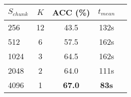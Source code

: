 \begin{table}[ht!]
    \centering
    \begin{tabular}{lc|ccc}
      \toprule
      $S_{chunk}$ & $K$ & ACC (\%) & $t_{mean}$ \\
      \midrule
      256  & 12 & 43.5 & 132s \\
      512  & 6  & 57.5 & 162s \\
      1024 & 3  & 64.5 & 162s \\
      2048 & 2  & 64.0 & 111s \\
      4096 & 1  & \textbf{67.0} & \textbf{83s} \\
      \bottomrule
    \end{tabular}
    \label{tab:RAG_evaluation}
\end{table}
    